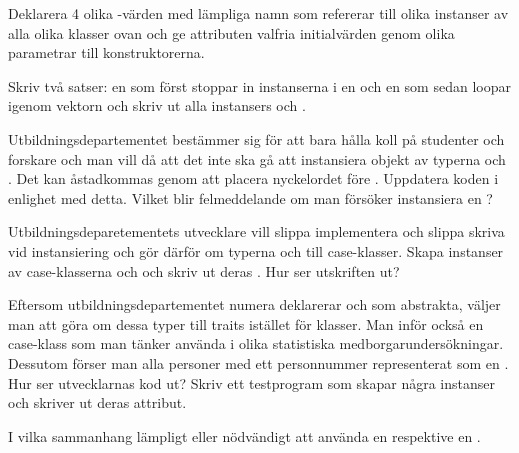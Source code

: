 \Subtask Deklarera 4 olika -värden med lämpliga namn som refererar till olika instanser av alla olika klasser ovan och ge attributen valfria initialvärden genom olika parametrar till konstruktorerna.

\Subtask Skriv två satser: en som först stoppar in instanserna i en  och en som sedan loopar igenom vektorn och skriv ut alla instansers  och . 


\Subtask Utbildningsdepartementet bestämmer sig för att bara hålla koll på studenter och forskare och man vill då att det inte ska gå att instansiera objekt av typerna  och . Det kan åstadkommas genom att placera nyckelordet  före . Uppdatera koden i enlighet med detta. Vilket blir felmeddelande om man försöker instansiera en ?

\Subtask Utbildningsdeparetementets utvecklare vill slippa implementera  och slippa skriva  vid instansiering och gör därför om typerna  och  till case-klasser. Skapa instanser av case-klasserna  och  och skriv ut deras . Hur ser utskriften ut?

\Subtask Eftersom utbildningsdepartementet numera deklarerar  och  som abstrakta, väljer man att göra om dessa typer till traits istället för klasser. Man inför också en case-klass  som man tänker använda i olika statistiska medborgarundersökningar. Dessutom förser man alla personer med ett personnummer representerat som en . Hur ser utvecklarnas kod ut? Skriv ett testprogram som skapar några instanser och skriver ut deras attribut. 

\Subtask\Pen I vilka sammanhang lämpligt eller nödvändigt att använda en  respektive en .




